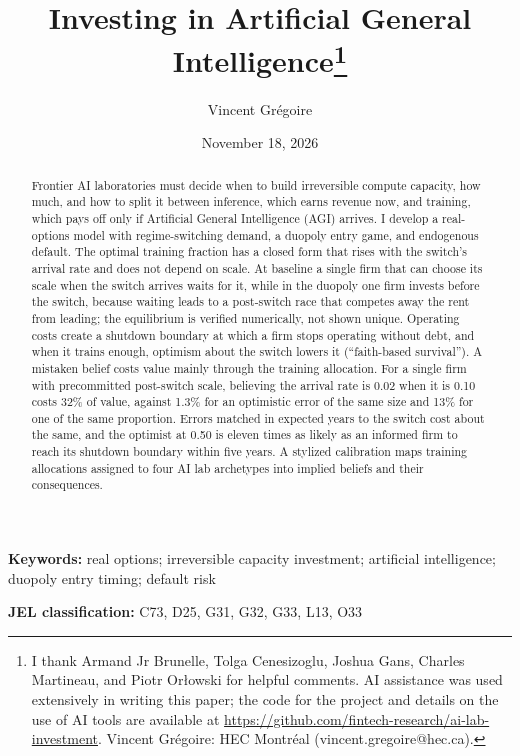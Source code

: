 \documentclass[
  11pt,
  letterpaper,
]{scrartcl}
\title{Investing in Artificial General Intelligence\thanks{I thank
Armand Jr Brunelle, Tolga Cenesizoglu, Joshua Gans, Charles Martineau,
and Piotr Orłowski for helpful comments. AI assistance was used
extensively in writing this paper; the code for the project and details
on the use of AI tools are available at
\url{https://github.com/fintech-research/ai-lab-investment}. Vincent
Grégoire: HEC Montréal (vincent.gregoire@hec.ca).}}
\author[1]{Vincent Grégoire}
\affil[1]{HEC Montréal}
\date{November 18, 2026}
\begin{document}
\maketitle
\begin{abstract}
Frontier AI laboratories must decide when to build irreversible compute
capacity, how much, and how to split it between inference, which earns
revenue now, and training, which pays off only if Artificial General
Intelligence (AGI) arrives. I develop a real-options model with
regime-switching demand, a duopoly entry game, and endogenous default.
The optimal training fraction has a closed form that rises with the
switch's arrival rate and does not depend on scale. At baseline a single
firm that can choose its scale when the switch arrives waits for it,
while in the duopoly one firm invests before the switch, because waiting
leads to a post-switch race that competes away the rent from leading;
the equilibrium is verified numerically, not shown unique. Operating
costs create a shutdown boundary at which a firm stops operating without
debt, and when it trains enough, optimism about the switch lowers it
(``faith-based survival''). A mistaken belief costs value mainly through
the training allocation. For a single firm with precommitted post-switch
scale, believing the arrival rate is 0.02 when it is 0.10 costs 32\% of
value, against 1.3\% for an optimistic error of the same size and 13\%
for one of the same proportion. Errors matched in expected years to the
switch cost about the same, and the optimist at 0.50 is eleven times as
likely as an informed firm to reach its shutdown boundary within five
years. A stylized calibration maps training allocations assigned to four
AI lab archetypes into implied beliefs and their consequences.
\end{abstract}

\begin{center}
\begin{minipage}{0.85\textwidth}
\small
\noindent\textbf{Keywords:} real options; irreversible capacity investment; artificial intelligence; duopoly entry timing; default risk\par
\medskip
\noindent\textbf{JEL classification:} C73, D25, G31, G32, G33, L13, O33\par
\end{minipage}
\end{center}
\bigskip
\end{document}
